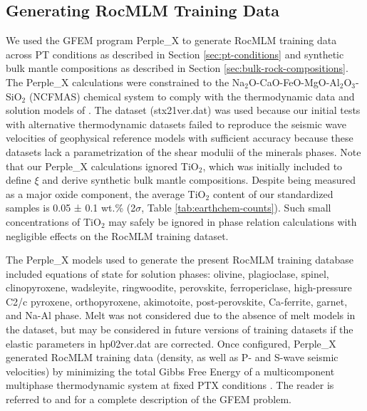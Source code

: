 \documentclass[draft,linenumbers]{agujournal2018}
\begin{document}
\subsection{Generating RocMLM Training Data}\label{sec:generate-training-data}

We used the GFEM program Perple\_X \citep[version 7.0.9,][]{connolly2009} to generate RocMLM training data across PT conditions as described in Section \ref{sec:pt-conditions} and synthetic bulk mantle compositions as described in Section \ref{sec:bulk-rock-compositions}. The Perple\_X calculations were constrained to the Na\(_2\)O-CaO-FeO-MgO-Al\(_2\)O\(_3\)-SiO\(_2\) (NCFMAS) chemical system to comply with the thermodynamic data and solution models of \citet{stixrude2022}. The \citet{stixrude2022} dataset (stx21ver.dat) was used because our initial tests with alternative thermodynamic datasets \citep[hp02ver.dat and hp633ver.dat,][]{connolly2002, holland2001, holland2018} failed to reproduce the seismic wave velocities of geophysical reference models \citep[PREM and STW105,][]{dziewonski1981, kustowski2008} with sufficient accuracy because these datasets lack a parametrization of the shear modulii of the minerals phases. Note that our Perple\_X calculations ignored TiO\(_2\), which was initially included to define \(\xi\) and derive synthetic bulk mantle compositions. Despite being measured as a major oxide component, the average TiO\(_2\) content of our standardized samples is 0.05 ± 0.1 wt.\% (2\(\sigma\), Table \ref{tab:earthchem-counts}). Such small concentrations of TiO\(_2\) may safely be ignored in phase relation calculations with negligible effects on the RocMLM training dataset.

The Perple\_X models used to generate the present RocMLM training database included equations of state for solution phases: olivine, plagioclase, spinel, clinopyroxene, wadsleyite, ringwoodite, perovskite, ferropericlase, high-pressure C2/c pyroxene, orthopyroxene, akimotoite, post-perovskite, Ca-ferrite, garnet, and Na-Al phase. Melt was not considered due to the absence of melt models in the \citet{stixrude2022} dataset, but may be considered in future versions of training datasets if the elastic parameters in hp02ver.dat are corrected. Once configured, Perple\_X generated RocMLM training data (density, as well as P- and S-wave seismic velocities) by minimizing the total Gibbs Free Energy of a multicomponent multiphase thermodynamic system at fixed PTX conditions \citep{gibbs1878, spear1993}. The reader is referred to \citet{connolly2009} and \citet{riel2022} for a complete description of the GFEM problem.
\end{document}
